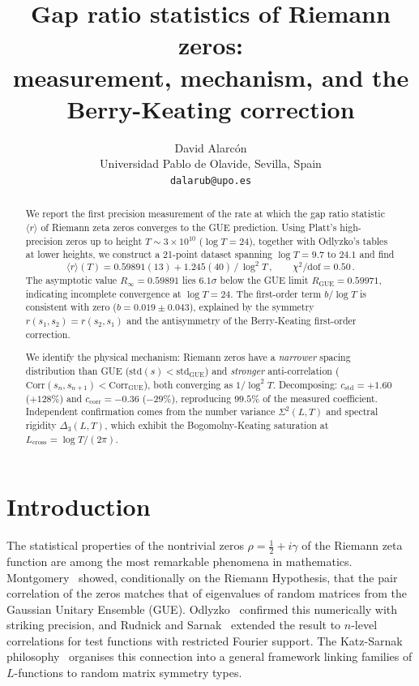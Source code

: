 \documentclass[11pt]{article}
\title{\textbf{Gap ratio statistics of Riemann zeros:\\
measurement, mechanism, and the Berry-Keating correction}}
\author{David Alarc\'on\\
\small Universidad Pablo de Olavide, Sevilla, Spain\\
\small \texttt{dalarub@upo.es}}
\date{}
\theoremstyle{plain}
\theoremstyle{remark}
\begin{document}
\maketitle

\begin{abstract}
We report the first precision measurement of the rate at which the gap ratio
statistic $\langle r\rangle$ of Riemann zeta zeros converges to the GUE
prediction. Using Platt's high-precision zeros up to height $T \sim 3\times 10^{10}$
($\log T = 24$), together with Odlyzko's tables at lower heights, we construct
a 21-point dataset spanning $\log T = 9.7$ to $24.1$ and find
\[
  \langle r\rangle(T) = 0.59891(13) + 1.245(40)\,/\,\log^2 T\,,
  \qquad \chi^2/\text{dof} = 0.50\,.
\]
The asymptotic value $R_\infty = 0.59891$ lies $6.1\sigma$ below the GUE
limit $R_{\mathrm{GUE}} = 0.59971$, indicating incomplete convergence at
$\log T = 24$. The first-order term $b/\log T$ is consistent with zero
($b = 0.019 \pm 0.043$), explained by the symmetry $r(s_1,s_2)=r(s_2,s_1)$
and the antisymmetry of the Berry-Keating first-order correction.

We identify the physical mechanism: Riemann zeros have a \emph{narrower}
spacing distribution than GUE ($\mathrm{std}(s) < \mathrm{std}_{\mathrm{GUE}}$)
and \emph{stronger} anti-correlation ($\mathrm{Corr}(s_n,s_{n+1}) <
\mathrm{Corr}_{\mathrm{GUE}}$), both converging as $1/\log^2 T$. Decomposing:
$c_{\mathrm{std}} = +1.60$ ($+128\%$) and $c_{\mathrm{corr}} = -0.36$ ($-29\%$),
reproducing $99.5\%$ of the measured coefficient. Independent confirmation
comes from the number variance $\Sigma^2(L,T)$ and spectral rigidity
$\Delta_3(L,T)$, which exhibit the Bogomolny-Keating saturation at
$L_{\mathrm{cross}} = \log T/(2\pi)$.
\end{abstract}


\section{Introduction}
\label{sec:intro}

The statistical properties of the nontrivial zeros
$\rho = \tfrac{1}{2} + i\gamma$ of the Riemann zeta function are among
the most remarkable phenomena in mathematics. Montgomery~\cite{montgomery1973}
showed, conditionally on the Riemann Hypothesis, that the pair correlation
of the zeros matches that of eigenvalues of random matrices from the
Gaussian Unitary Ensemble (GUE). Odlyzko~\cite{odlyzko1987} confirmed
this numerically with striking precision, and Rudnick and
Sarnak~\cite{rudnick1996} extended the result to $n$-level correlations
for test functions with restricted Fourier support. The Katz-Sarnak
philosophy~\cite{katzsarnak1999} organises this connection into a general
framework linking families of $L$-functions to random matrix symmetry types.
\end{document}
